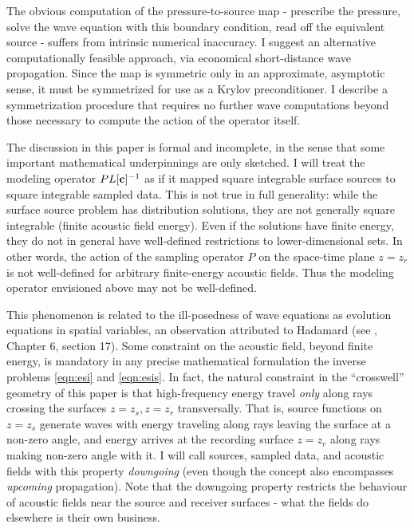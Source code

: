 \documentclass[georeport,12pt]{geophysics}
\begin{document}
The obvious computation of the pressure-to-source map - prescribe the
pressure, solve the wave equation with this boundary condition, read
off the equivalent source - suffers from intrinsic numerical
inaccuracy. I suggest an alternative computationally feasible
approach, via economical short-distance wave propagation. Since the
map is symmetric only in an approximate, asymptotic sense, it must be
symmetrized for use as a Krylov preconditioner. I describe a
symmetrization procedure that requires no further wave computations
beyond those necessary to compute the action of the operator itself.

The discussion in this paper is formal and incomplete, in the sense
that some important mathematical underpinnings are only
sketched. I will treat the modeling operator $PL[{\bf c}]^{-1}$ as if
it mapped square integrable surface sources to square integrable sampled
data. This is not true in full generality: while the surface source
problem has distribution solutions, they are not generally square
integrable (finite acoustic field energy). Even if the solutions have
finite energy, they do not in general have well-defined
restrictions to lower-dimensional sets. In other words, the action of
the sampling
operator $P$ on the space-time plane $z=z_r$ is not well-defined for arbitrary
finite-energy acoustic fields. Thus the modeling operator envisioned above
may not be well-defined.

This
phenomenon is related to the ill-posedness of wave equations as
evolution equations in spatial variables, an observation attributed to
Hadamard (see \cite{CourHil:62}, Chapter 6, section 17). Some constraint on the acoustic field,
beyond finite energy, is mandatory in any precise mathematical formulation the inverse problems
\ref{eqn:esi} and \ref{eqn:esis}. In fact, the natural constraint in
the ``crosswell'' geometry of this paper is that high-frequency energy
travel {\em only} along rays crossing the
surfaces $z=z_s, z=z_r$ transversally. That is, source functions on
$z=z_s$ generate waves with energy traveling along rays leaving the surface at a non-zero angle, and
energy arrives at the recording surface $z=z_r$ along rays making
non-zero angle with it. I will call sources, sampled data, and
acoustic fields with this property {\em
  downgoing} (even though the concept also encompasses {\em upcoming}
propagation). Note that the downgoing property restricts the behaviour of
acoustic fields near the source and receiver surfaces - what the
fields do elsewhere is their own business.
\end{document}
